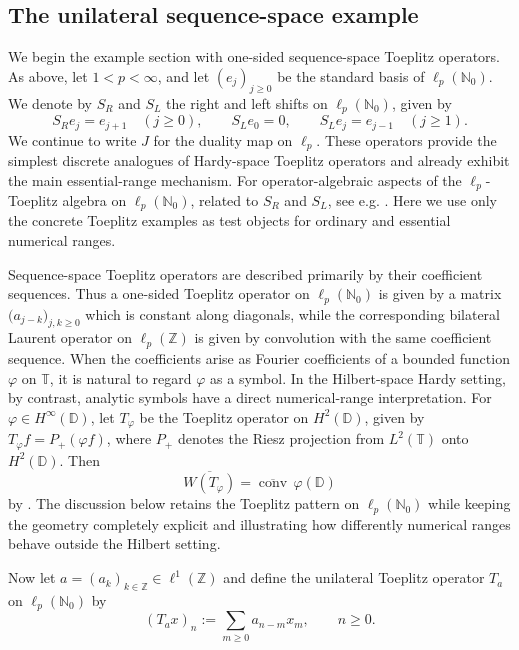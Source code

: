 \documentclass[11pt]{amsart}
\numberwithin{equation}{section}
\theoremstyle{definition}
\theoremstyle{remark}
\DeclareMathOperator{\conv}{conv}
\begin{document}
\subsection{The unilateral sequence-space example}\label{sec:unilateral-sequence-model}

We begin the example section with one-sided sequence-space Toeplitz operators. As above, let
$1<p<\infty$, and let $(e_j)_{j\ge0}$ be the standard basis of
$\ell_p(\mathbb N_0)$. We denote by $S_R$ and $S_L$ the right and left shifts on
$\ell_p(\mathbb N_0)$, given by
\begin{equation}\label{shifts}
S_Re_j=e_{j+1}\quad(j\ge0),\qquad
S_Le_0=0,\qquad S_Le_j=e_{j-1}\quad(j\ge1).
\end{equation}
We continue to write $J$ for the duality map on $\ell_p$. These operators provide the simplest discrete analogues of Hardy-space Toeplitz operators and already exhibit the main essential-range mechanism.
For operator-algebraic aspects of the \(\ell_p\)-Toeplitz algebra on
\(\ell_p(\mathbb N_0)\), related to $S_R$ and $S_L$, see e.g. \cite{Wang2021}.
Here we use only the concrete Toeplitz examples as test objects for ordinary
and essential numerical ranges.

Sequence-space Toeplitz operators are described primarily by their coefficient sequences. Thus a one-sided Toeplitz operator on $\ell_p(\mathbb N_0)$ is given by a matrix $\bigl(a_{j-k}\bigr)_{j,k\ge0}$ which is constant along diagonals, while the corresponding bilateral Laurent operator on $\ell_p(\mathbb Z)$ is given by convolution with the same coefficient sequence. When the coefficients arise as Fourier coefficients of a bounded function $\varphi$ on $\mathbb T$, it is natural to regard $\varphi$ as a symbol. In the Hilbert-space Hardy setting, by contrast, analytic symbols have a direct numerical-range interpretation. For $\varphi\in H^\infty(\mathbb D)$, let $T_\varphi$ be the Toeplitz operator on $H^2(\mathbb D)$, given by $T_\varphi f=P_+(\varphi f)$, where $P_+$ denotes the Riesz projection from $L^2(\mathbb T)$ onto $H^2(\mathbb D)$. Then 
\[
        \overline{W(T_\varphi)}=\overline{\conv}\,\varphi(\mathbb D)
\]
by \cite{KleinToeplitz}. The discussion below retains the Toeplitz pattern on $\ell_p(\mathbb N_0)$ while keeping the geometry completely explicit and illustrating how differently numerical ranges behave outside the Hilbert setting.


Now let $a=(a_k)_{k\in\mathbb Z}\in \ell^1(\mathbb Z)$ and define the unilateral Toeplitz operator $T_a$ on $\ell_p(\mathbb N_0)$
by
\begin{equation}\label{toepldef}
(T_a x)_n:=\sum_{m\ge 0} a_{n-m}x_m,
\qquad n\ge 0.
\end{equation}
\end{document}
